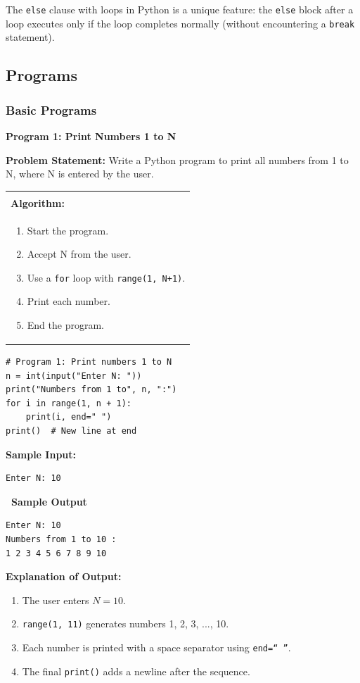 \documentclass[12pt,a4paper]{article}
\makeatletter
\newcommand{\outhead}{\noindent\colorbox{cmrgreen!25}%
  {\textbf{\small\color{cmrdark}~Sample Output~}}\par\vspace{-1pt}}
\newenvironment{algobox}{%
  \par\vspace{4pt}%
  \noindent\begin{tabular}{@{}p{\linewidth}@{}}%
  \hline\\[-8pt]%
  \textbf{\color{blue!60!black}\small Algorithm:}\\[2pt]%
}{%
  \\[-4pt]\hline%
  \end{tabular}\par\vspace{4pt}%
}
\makeatother
\begin{document}
The \texttt{else} clause with loops in Python is a unique feature: the \texttt{else} block after a loop executes only if the loop completes normally (without encountering a \texttt{break} statement).

\subsection{Programs}
\subsubsection{Basic Programs}

\textbf{Program 1: Print Numbers 1 to N}

\textbf{Problem Statement:}
Write a Python program to print all numbers from 1 to N, where N is entered by the user.

\begin{algobox}
\begin{enumerate}[label=Step \arabic*:]
  \item Start the program.
  \item Accept N from the user.
  \item Use a \texttt{for} loop with \texttt{range(1, N+1)}.
  \item Print each number.
  \item End the program.
\end{enumerate}
\end{algobox}

\begin{lstlisting}
# Program 1: Print numbers 1 to N
n = int(input("Enter N: "))
print("Numbers from 1 to", n, ":")
for i in range(1, n + 1):
    print(i, end=" ")
print()  # New line at end
\end{lstlisting}

\textbf{Sample Input:}
\begin{verbatim}
Enter N: 10
\end{verbatim}

\outhead
\begin{lstlisting}[style=outputstyle]
Enter N: 10
Numbers from 1 to 10 :
1 2 3 4 5 6 7 8 9 10
\end{lstlisting}

\textbf{Explanation of Output:}
\begin{enumerate}
  \item The user enters $N = 10$.
  \item \texttt{range(1, 11)} generates numbers 1, 2, 3, ..., 10.
  \item Each number is printed with a space separator using \texttt{end=`` ''}.
  \item The final \texttt{print()} adds a newline after the sequence.
\end{enumerate}
\end{document}
